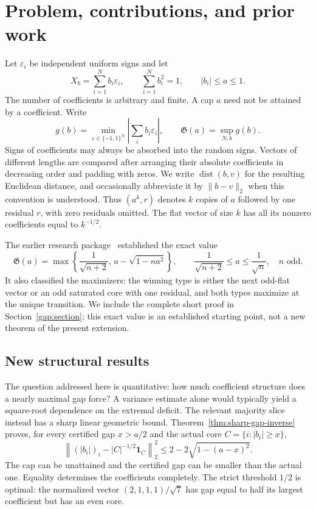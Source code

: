 \documentclass[11pt]{article}
\theoremstyle{remark}\newtheorem{remark}[theorem]{Remark}
\begin{document}
\section{Problem, contributions, and prior work}
Let $\varepsilon_i$ be independent uniform signs and let
\[
 X_b=\sum_{i=1}^N b_i\varepsilon_i,\qquad
 \sum_{i=1}^N b_i^2=1,\qquad |b_i|\le a\le1.
\]
The number of coefficients is arbitrary and finite. A cap $a$ need not
be attained by a coefficient. Write
\[
 g(b)=\min_{\varepsilon\in\{-1,1\}^N}
       \left|\sum_i b_i\varepsilon_i\right|,
 \qquad
 \mathfrak G(a)=\sup_{N,b}g(b).
\]
Signs of coefficients may always be absorbed into the random signs.
Vectors of different lengths are compared after arranging their absolute
coefficients in decreasing order and padding with zeros. We write
$\operatorname{dist}(b,v)$ for the resulting Euclidean distance, and
occasionally abbreviate it by $\|b-v\|_2$ when this convention is understood.
Thus $(a^k,r)$ denotes $k$ copies of $a$ followed by one residual $r$,
with zero residuals omitted. The flat vector of size $k$ has all its
nonzero coefficients equal to $k^{-1/2}$.

The earlier research package~\cite{Prior} established the exact value
\begin{equation}\label{eq:intro-gap}
 \mathfrak G(a)=\max\left\{\frac1{\sqrt{n+2}},\,
 a-\sqrt{1-na^2}\right\},\qquad
 \frac1{\sqrt{n+2}}\le a\le\frac1{\sqrt n},\quad n\text{ odd}.
\end{equation}
It also classified the maximizers: the winning type is either the next
odd-flat vector or an odd saturated core with one residual, and both
types maximize at the unique transition. We include the complete short
proof in Section~\ref{gap:section}; this exact value is an established
starting point, not a new theorem of the present extension.

\subsection{New structural results}
The question addressed here is quantitative: how much coefficient
structure does a nearly maximal gap force? A variance estimate alone
would typically yield a square-root dependence on the extremal deficit.
The relevant majority slice instead has a sharp linear geometric bound.
Theorem~\ref{thm:sharp-gap-inverse} proves, for every certified gap
$x>a/2$ and the actual core $C=\{i:|b_i|\ge x\}$,
\[
 \left\|(|b_i|)_i-|C|^{-1/2}\mathbf1_C\right\|_2^2
 \le2-2\sqrt{1-(a-x)^2}.
\]
The cap can be unattained and the certified gap can be smaller than the
actual one. Equality determines the coefficients completely. The strict
threshold $1/2$ is optimal: the normalized vector $(2,1,1,1)/\sqrt7$
has gap equal to half its largest coefficient but has an even core.
\end{document}
